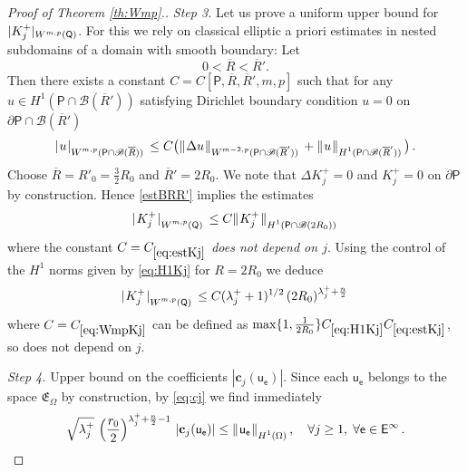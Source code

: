 \documentclass[titlepage,12pt]{amsart}
\theoremstyle{definition}
\theoremstyle{remark}
\numberwithin{equation}{section}
\newcommand{\ee}{\hskip0.15ex}
\newcommand{\dd}[1]{_{\raise-0.6ex\hbox{$\scriptstyle #1$}}}
\newcommand {\Norm}[2]{ \mathchoice
    {|\ee #1\ee|\dd{#2}\,}
    {| #1 |_{#2}}
    {| #1 |_{#2}}
    {| #1 |_{#2}} }
\newcommand {\DNorm}[2]{ \mathchoice
    {\|\ee #1\ee\|\dd{#2}\,}
    {\| #1 \|_{#2}}
    {\| #1 \|_{#2}}
    {\| #1 \|_{#2}} }
\newcommand{\sB}{{\mathscr B}}
\newcommand{\rP}{{\mathsf{P}}}
\newcommand{\rQ}{{\mathsf{Q}}}
\newcommand{\sfe}{{\mathsf e}}
\newcommand{\sfE}{{\mathsf E}}
\newcommand{\sfu}{{\mathsf u}}
\newcommand {\gE}{\mathfrak{E}}
\newcommand{\oR}{\overline{R}}
\begin{document}
\begin{proof}[Proof of Theorem \ref{th:Wmp}.]
{\em Step 3.} Let us prove a uniform upper bound for $\Norm{K^+_j}{W^{m,p}(\rQ)}$.
For this we rely on classical elliptic a priori estimates in nested subdomains of a domain with smooth boundary: Let
\[
   0<\oR<\oR'.
\]
Then there exists a constant $C=C[\rP,\oR,\oR',m,p]$ such that for any $u\in H^1(\rP\cap\sB(\oR'))$ satisfying Dirichlet boundary condition $u=0$ on $\partial\rP\cap\sB(\oR')$
\begin{equation}
\label{estBRR'}
   \Norm{u}{W^{m,p}(\rP\cap\sB(\oR))} \le 
   C\big( \DNorm{\Delta u}{W^{m-2,p}(\rP\cap\sB(\oR'))} 
   + \DNorm{u}{H^{1}(\rP\cap\sB(\oR'))} \big)\,.
\end{equation}
Choose $\oR=R'_0=\frac{3}{2}R_0$ and $\oR'=2R_0$.
We note that $\Delta K^+_j=0$ and $K^+_j=0$ on $\partial\rP$ by construction. 
Hence \eqref{estBRR'} implies the estimates
\begin{equation}
\label{eq:estKj}
   \Norm{K^+_j}{W^{m,p}(\rQ)} \le 
   C \DNorm{K^+_j}{H^{1}(\rP\cap\sB(2R_0))} 
\end{equation}
where the constant $C=C_{\eqref{eq:estKj}}$ {\em does not depend on $j$}. Using the control of the $H^1$ norms given by \eqref{eq:H1Kj} for $R=2R_0$ we deduce
\begin{equation}
\label{eq:WmpKj}
   \Norm{K^+_j}{W^{m,p}(\rQ)} \le 
   C (\lambda^+_j+1)^{1/2}\, (2R_0)^{\lambda^+_j+\frac{n}{2}} \,
\end{equation}
where $C=C_{\eqref{eq:WmpKj}}$ can be defined as $\max\{1,\frac{1}{2R_0}\}C_{\eqref{eq:H1Kj}}C_{\eqref{eq:estKj}}$, so does not depend on $j$.

{\em Step 4.} Upper bound on the coefficients $|\mathbf{c}_j(\sfu_\sfe)|$. Since each $\sfu_\sfe$ belongs to the space $\gE_\Omega$ by construction, by \eqref{eq:cj} we find immediately
\[
   \sqrt{\lambda^+_j} \,\left(\frac{r_0}{2}\right)^{\lambda^+_j+\frac{n}{2}-1}
   \,|\mathbf{c}_j(\sfu_\sfe)| \le 
   \DNorm{\sfu_\sfe}{H^1(\Omega)},
   \quad\forall j\ge1,\;\forall\sfe\in\sfE^\infty\,.
\]


\end{proof}
\end{document}
